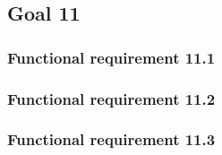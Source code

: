 \subsection{Goal 11}

\setcounter{secnumdepth}{3}
\subsubsection{Functional requirement 11.1}

\subsubsection{Functional requirement 11.2}

\subsubsection{Functional requirement 11.3}
